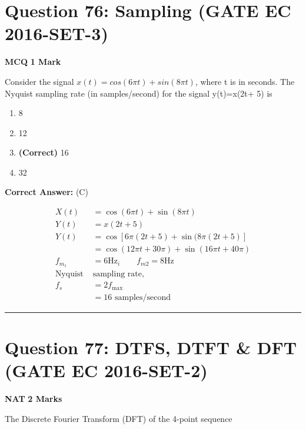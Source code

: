 \documentclass[11pt,a4paper]{article}
\begin{document}
\section*{Question 76: Sampling (GATE EC 2016-SET-3)}
\noindent \textbf{\color{primary}MCQ} \hfill \textbf{\color{secondary}1 Mark}


\noindent Consider the signal $x(t)=cos(6\pi t)+sin(8\pi t)$,  where t is in seconds. The Nyquist sampling rate (in samples/second) for the signal y(t)=x(2t+ 5) is


\begin{enumerate}[label=(\Alph*)]
    \item 8
    \item 12
    \item \textbf{(Correct)} 16
    \item 32
\end{enumerate}

\noindent \textbf{Correct Answer:} (C)

\begin{tcolorbox}[solbox, title=Detailed Solution -- Question 76]
\[
\begin{aligned} X(t) & =\cos (6 \pi t)+\sin (8 \pi t) \\ Y(t) & =x(2 t+5) \\ Y(t) & =\cos [6 \pi(2 t+5)+\sin (8 \pi(2 t+5)] \\ & =\cos (12 \pi t+30 \pi)+\sin (16 \pi t+40 \pi) \\ f_{m_{1}} & =6 \mathrm{Hz}_{i} \qquad f_{m 2}=8 \mathrm{Hz}\\ \text{Nyquist }&\text{sampling rate},\\ f_{s} &=2 f_{\max } \\ &=16 \text { samples/second } \end{aligned}
\]
\end{tcolorbox}

\vspace{1.5em}
\hrule
\vspace{1.5em}

\section*{Question 77: DTFS, DTFT \& DFT (GATE EC 2016-SET-2)}
\noindent \textbf{\color{primary}NAT} \hfill \textbf{\color{secondary}2 Marks}


\noindent The Discrete Fourier Transform (DFT) of the 4-point sequence 
\end{document}
